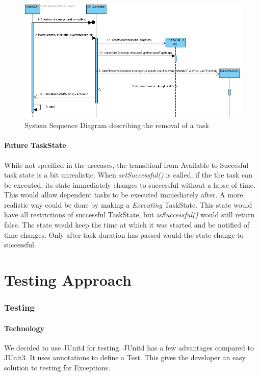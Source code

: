 			\begin{figure}[H]
				\begin{center}
					\includegraphics[scale=0.5]{images/System_Initiation.jpg}
				\end{center}
				\caption{System Sequence Diagram describing the removal of a task}
			\end{figure}

		\subsection{Future TaskState}
			While not specified in the usecases, the transitionf from Available to Succesful task state is a bit unrealistic. When \emph{setSuccessful()} is called, if the the task can be executed, its state immediately changes to successful without a lapse of time. This would allow dependent tasks to be executed immediately after. A more realistic way could be done by making a \emph{Executing} TaskState. This state would have all restrictions of successful TaskState, but \emph{isSuccessful()} would still return false. The state would keep the time at which it was started and be notified of time changes. Only after task duration has passed would the state change to successful.
		
\part{Testing Approach}
	
	\section{Testing}
		\subsection{Technology}
		We decided to use JUnit4 for testing.
		JUnit4 has a few advantages compared to JUnit3. It uses annotations to define a Test. This gives the developer an easy solution to testing for Exceptions.
